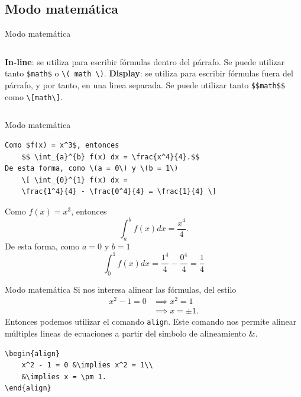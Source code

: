 \documentclass[../slides.tex]{subfiles}
\begin{document}
    \begin{frame}
        \tableofcontents[sections=\value{section}]
    \end{frame}

    \subsection{Modo matemática}

    \begin{frame}[fragile]{Modo matemática}
        \begin{columns}[t]
                \textbf{In-line}: se utiliza para escribir fórmulas dentro del párrafo. Se puede utilizar tanto \texttt{\$math\$} o \texttt{\textbackslash ( math \textbackslash )}.
                \textbf{Display}: se utiliza para escribir fórmulas fuera del párrafo, y por tanto, en una linea separada. Se puede utilizar tanto \texttt{\$\$math\$\$} como \texttt{\textbackslash[math\textbackslash]}.
        \end{columns}
        
    \end{frame}
        
    \begin{frame}[fragile]{Modo matemática}
        \begin{verbatim}
Como $f(x) = x^3$, entonces
    $$ \int_{a}^{b} f(x) dx = \frac{x^4}{4}.$$
De esta forma, como \(a = 0\) y \(b = 1\)
    \[ \int_{0}^{1} f(x) dx = 
    \frac{1^4}{4} - \frac{0^4}{4} = \frac{1}{4} \]
        \end{verbatim}
Como $f(x) = x^3$, entonces
    $$ \int_{a}^{b} f(x) dx = \frac{x^4}{4}.$$
De esta forma, como \(a = 0\) y \(b = 1\)
    \[ \int_{0}^{1} f(x) dx = 
    \frac{1^4}{4} - \frac{0^4}{4} = \frac{1}{4} \]
    \end{frame}

        \begin{frame}[fragile]{Modo matemática}
        Si nos interesa alinear las fórmulas, del estilo
            \begin{align}
            	x^2 - 1 = 0 &\implies x^2 = 1\\
            	&\implies x = \pm 1.
            \end{align}
        Entonces podemos utilizar el comando \texttt{align}. Este comando nos permite alinear múltiples lineas de ecuaciones a partir del simbolo de alineamiento \&.
            \begin{verbatim}
\begin{align}
    x^2 - 1 = 0 &\implies x^2 = 1\\
    &\implies x = \pm 1.
\end{align}
            \end{verbatim}

    \end{frame}
    
\end{document}

